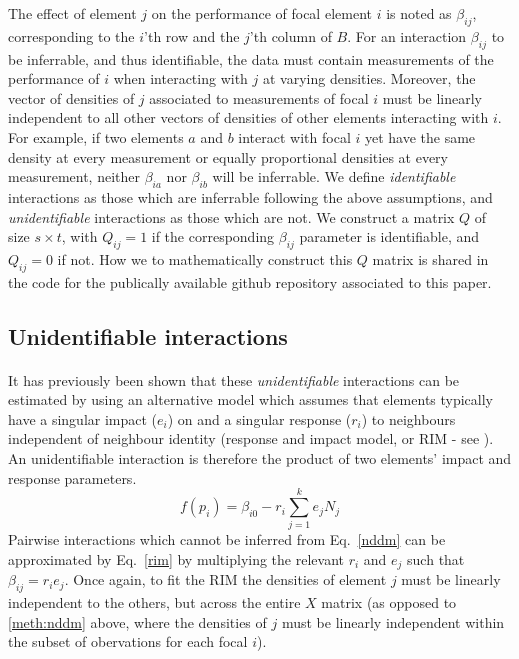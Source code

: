 \documentclass[a4,12pt]{article}
\begin{document}
    The effect of element $j$ on the performance of focal element $i$ is noted as $\beta_{ij}$, corresponding to the $i$'th row and the $j$'th column of $B$. 
    For an interaction $\beta_{ij}$ to be inferrable, and thus identifiable, the data must contain measurements of the performance of $i$ when interacting with $j$ at varying densities. Moreover, the vector of densities of $j$ associated to measurements of focal $i$ must be linearly independent to all other vectors of densities of other elements interacting with $i$. For example, if two elements $a$ and $b$ interact with focal $i$ yet have the same density at every measurement or equally proportional densities at every measurement, neither $\beta_{ia}$ nor $\beta_{ib}$ will be inferrable. We define \textit{identifiable} interactions as those which are inferrable following the above assumptions, and \textit{unidentifiable} interactions as those which are not. We construct a matrix $Q$ of size $s \times t$, with $Q_{ij} = 1$ if the corresponding $\beta_{ij}$ parameter is identifiable, and $Q_{ij} = 0$ if not. How we to mathematically construct this $Q$ matrix is shared in the code for the publically available github repository associated to this paper.

    
    
    \subsection{Unidentifiable interactions}
    \label{meth:rim}

    \paragraph{}
    It has previously been shown that these \textit{unidentifiable} interactions can be estimated by using an alternative model which assumes that elements typically have a singular impact ($e_i$) on and a singular response ($r_i$) to neighbours independent of neighbour identity (response and impact model, or RIM - see \cite{Godoy2014b}). An unidentifiable interaction is therefore the product of two elements' impact and response parameters. 
        \begin{equation}
        f(p_{i}) = \beta_{i0} - r_{i} \sum_{j=1}^{k} e_{j} N_{j}
        \label{rim}
        \end{equation}
        Pairwise interactions which cannot be inferred from Eq.~\ref{nddm} can be approximated by Eq.~\ref{rim} by multiplying the relevant $r_{i}$ and $e_{j}$ such that $\beta_{ij} = r_{i} e_{j}$. Once again, to fit the RIM the densities of element $j$ must be linearly independent to the others, but across the entire $X$ matrix (as opposed to \ref{meth:nddm} above, where the densities of $j$ must be linearly independent within the subset of obervations for each focal $i$).
\end{document}
